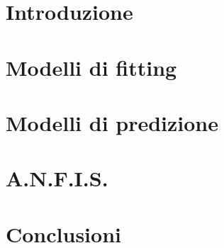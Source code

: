 


\maketitle
\clearpage

\tableofcontents
\clearpage

\section{Introduzione}


\section{Modelli di fitting}



\section{Modelli di predizione}


\section{A.N.F.I.S.}            %


\section{Conclusioni}



